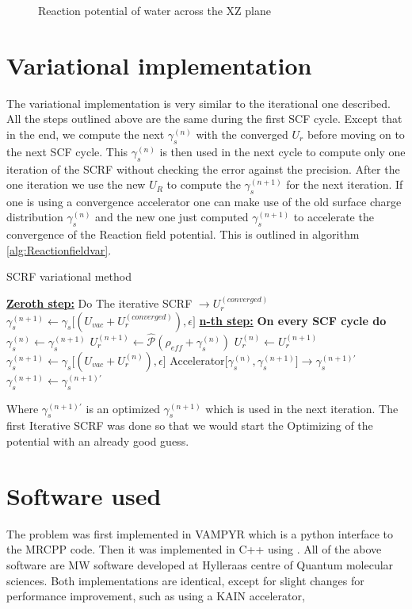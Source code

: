 \documentclass[..Thesis.tex]{subfiles}
\begin{document}
\begin{figure}[h!]
\begin{subfigure}[b]{\linewidth}
  \end{subfigure}
  \caption{Reaction potential of water across the XZ plane}
  \label{fig:watpots}
\end{figure}

\section{Variational implementation}
The variational implementation is very similar to the iterational one described.
All the steps outlined above are the same during the first \ac{SCF} cycle. Except
that in the end, we compute the next $\gamma_s^{(n)}$ with the converged $U_r$ before
moving on to the next \ac{SCF} cycle. This $\gamma_s^{(n)}$ is then used in the next cycle
to compute only one iteration of the \ac{SCRF} without checking the error against the
precision. After the one iteration we use the new $U_R$ to compute the $\gamma_s^{(n+1)}$
for the next iteration. If one is using a convergence accelerator one can make
use of the old surface charge distribution $\gamma_s^{(n)}$ and the new one just computed
$\gamma_s^{(n+1)}$ to accelerate the convergence of the Reaction field potential.
This is outlined in algorithm \ref{alg:Reactionfieldvar}.
\begin{algorithm}
  \caption{\ac{SCRF} variational method}\label{alg:Reactionfieldvar}
  \begin{algorithmic}
    \STATE \underline{\textbf{Zeroth step:}}
    \STATE Do The iterative \ac{SCRF} $\rightarrow U_r^{(converged)}$
    \STATE $\gamma_s^{(n+1)} \leftarrow \gamma_s\big[(U_{vac}+ U_r^{(converged)}), \epsilon\big]$
    \STATE \underline{\textbf{n-th step:}}
    \STATE \textbf{On every SCF cycle do}
    \STATE $\gamma_s^{(n)} \leftarrow \gamma_s^{(n+1)}$
    \STATE $U_r^{(n+1)} \leftarrow \hat{\mathscr{P}} (\rho_{eff} + \gamma_s^{(n)})$
    \STATE $U_r^{(n)} \leftarrow U_r^{(n+1)}$
    \STATE $\gamma_s^{(n+1)} \leftarrow \gamma_s\big[(U_{vac}+ U_r^{(n)}), \epsilon\big]$
    \STATE Accelerator[$\gamma_s^{(n)}, \gamma_s^{(n+1)}] \rightarrow \gamma_s^{(n+1)\prime}$
    \STATE $\gamma_s^{(n+1)} \leftarrow\gamma_s^{(n+1)\prime}$
  \end{algorithmic}
\end{algorithm}
Where $\gamma_s^{(n+1)\prime}$ is an optimized $\gamma_s^{(n+1)}$ which is used
in the next iteration. The first Iterative \ac{SCRF} was done so that we would
start the Optimizing of the potential with an already good guess.
\section{Software used}
The problem was first implemented in VAMPYR \cite{Vampyr} which is a python interface to the
MRCPP \cite{MRCPP} code.  Then it was implemented in C++ using \mrchem \cite{MRchem}. All of the above software
are \ac{MW} software developed at Hylleraas centre of Quantum molecular sciences.
Both implementations are identical, except for slight changes for
performance improvement, such as using a KAIN accelerator,


\biblio
\end{document}
